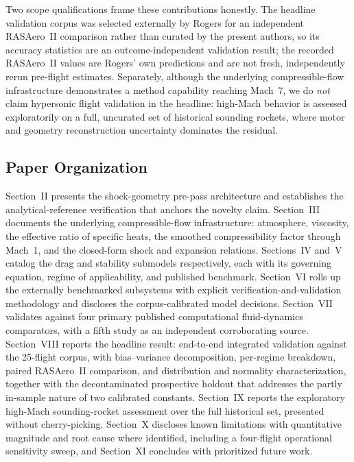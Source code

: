 Two scope qualifications frame these contributions honestly. The headline
validation corpus was selected externally by Rogers for an independent RASAero~II
comparison rather than curated by the present authors, so its accuracy statistics
are an outcome-independent validation result; the recorded RASAero~II values are
Rogers' own predictions and are not fresh, independently rerun pre-flight
estimates. Separately, although the underlying compressible-flow infrastructure
demonstrates a method capability reaching Mach~7, we do \emph{not} claim
hypersonic flight validation in the headline: high-Mach behavior is assessed
exploratorily on a full, uncurated set of historical sounding rockets, where
motor and geometry reconstruction uncertainty dominates the residual.

\subsection{Paper Organization}

Section~II presents the shock-geometry pre-pass architecture and establishes the
analytical-reference verification that anchors the novelty claim. Section~III
documents the underlying compressible-flow infrastructure: atmosphere,
viscosity, the effective ratio of specific heats, the smoothed compressibility
factor through Mach~1, and the closed-form shock and expansion relations.
Sections~IV and~V catalog the drag and stability submodels respectively, each
with its governing equation, regime of applicability, and published benchmark.
Section~VI rolls up the externally benchmarked subsystems with explicit
verification-and-validation methodology and discloses the corpus-calibrated model
decisions. Section~VII validates against four primary published
computational fluid-dynamics comparators, with a fifth study as an independent
corroborating source. Section~VIII reports the headline result:
end-to-end integrated validation against the 25-flight corpus, with
bias--variance decomposition, per-regime breakdown, paired RASAero~II
comparison, and distribution and normality characterization, together with the
decontaminated prospective holdout that addresses the
partly in-sample nature of two calibrated constants. Section~IX reports the
exploratory high-Mach sounding-rocket assessment over the full historical set,
presented without cherry-picking. Section~X discloses known limitations with
quantitative magnitude and root cause where identified, including a four-flight
operational sensitivity sweep, and Section~XI concludes
with prioritized future work.
